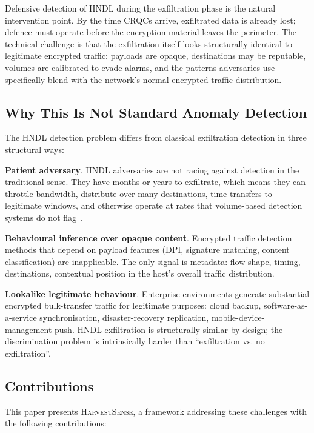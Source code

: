 \documentclass[sigconf,nonacm]{acmart}
\begin{document}
Defensive detection of HNDL during the exfiltration phase is the
natural intervention point. By the time CRQCs arrive, exfiltrated data
is already lost; defence must operate before the encryption material
leaves the perimeter. The technical challenge is that the exfiltration
itself looks structurally identical to legitimate encrypted traffic:
payloads are opaque, destinations may be reputable, volumes are
calibrated to evade alarms, and the patterns adversaries use
specifically blend with the network's normal encrypted-traffic
distribution.

\subsection{Why This Is Not Standard Anomaly Detection}

The HNDL detection problem differs from classical exfiltration detection
in three structural ways:

\textbf{Patient adversary}. HNDL adversaries are not racing against
detection in the traditional sense. They have months or years to
exfiltrate, which means they can throttle bandwidth, distribute over
many destinations, time transfers to legitimate windows, and
otherwise operate at rates that volume-based detection systems do not
flag~\cite{verizon2024dbir,mandiant2024mtrends}.

\textbf{Behavioural inference over opaque content}. Encrypted traffic
detection methods that depend on payload features (DPI, signature
matching, content classification) are inapplicable. The only signal is
metadata: flow shape, timing, destinations, contextual position in
the host's overall traffic distribution.

\textbf{Lookalike legitimate behaviour}. Enterprise environments
generate substantial encrypted bulk-transfer traffic for legitimate
purposes: cloud backup, software-as-a-service synchronisation,
disaster-recovery replication, mobile-device-management push.
HNDL exfiltration is structurally similar by design; the
discrimination problem is intrinsically harder than ``exfiltration vs.
no exfiltration''.

\subsection{Contributions}

This paper presents \textsc{HarvestSense}, a framework addressing
these challenges with the following contributions:
\end{document}
